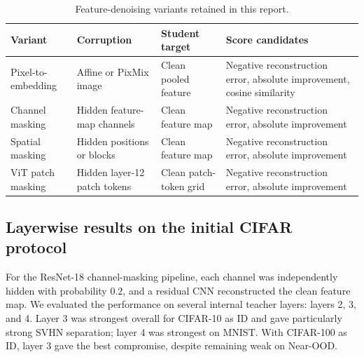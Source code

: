 \begin{table}[ht]
\centering
{}
\begin{tabularx}{\textwidth}{@{}L{3.0cm}L{3.4cm}YY@{}}
\toprule
Variant & Corruption & Student target & Score candidates \\
\midrule
Pixel-to-embedding & Affine or PixMix image & Clean pooled feature &
Negative reconstruction error, absolute improvement, cosine similarity \\
Channel masking & Hidden feature-map channels & Clean feature map &
Negative reconstruction error, absolute improvement \\
Spatial masking & Hidden positions or blocks & Clean feature map &
Negative reconstruction error, absolute improvement \\
ViT patch masking & Hidden layer-12 patch tokens & Clean patch-token grid &
Negative reconstruction error, absolute improvement \\
\bottomrule
\end{tabularx}
\caption{Feature-denoising variants retained in this report.}
\label{tab:feature-denoising-variants}
\end{table}

\subsection{Layerwise results on the initial CIFAR protocol}

\headingindent
For the ResNet-18 channel-masking pipeline, each channel was independently
hidden with probability $0.2$, and a residual CNN reconstructed the clean
feature map. We evaluated the performance on several internal teacher layers: layers 2, 3, and 4. Layer 3
was strongest overall for CIFAR-10 as ID and gave particularly strong SVHN
separation; layer 4 was strongest on MNIST. With CIFAR-100 as ID, layer 3 gave
the best compromise, despite remaining weak on Near-OOD.

